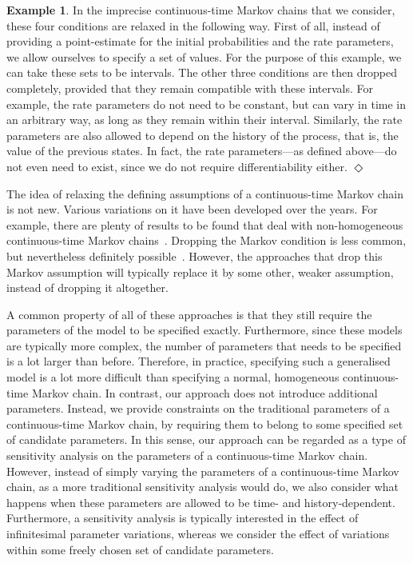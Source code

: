 \documentclass[10pt,a4paper]{paper}
\theoremstyle{definition}
\newtheorem{exmp}{Example}%
\newcommand{\exampleend}{\hfill$\Diamond$}
\begin{document}
\begin{exmp}
In the imprecise continuous-time Markov chains that we consider, these four conditions are relaxed in the following way. First of all, instead of providing a point-estimate for the initial probabilities and the rate parameters, we allow ourselves to specify a set of values. For the purpose of this example, we can take these sets to be intervals. The other three conditions are then dropped completely, provided that they remain compatible with these intervals. For example, the rate parameters do not need to be constant, but can vary in time in an arbitrary way, as long as they remain within their interval. Similarly, the rate parameters are also allowed to depend on the history of the process, that is, the value of the previous states. In fact, the rate parameters---as defined above---do not even need to exist, since we do not require differentiability either.
\exampleend\vspace{10pt}
\end{exmp}

The idea of relaxing the defining assumptions of a continuous-time Markov chain is not new. Various variations on it have been developed over the years.
For example, there are plenty of results to be found that deal with non-homogeneous continuous-time Markov chains~\cite{rindos1995exact,aalen1978empirical,johnson1989nonhomogeneous}.
Dropping the Markov condition is less common, but nevertheless definitely possible~\cite{Harlamov:1320525}. However, the approaches that drop this Markov assumption will typically replace it by some other, weaker assumption, instead of dropping it altogether. %

A common property of all of these approaches is that they still require the parameters of the model to be specified exactly. Furthermore, since these models are typically more complex, the number of parameters that needs to be specified is a lot larger than before. Therefore, in practice, specifying such a generalised model is a lot more difficult than specifying a normal, homogeneous continuous-time Markov chain.
In contrast, our approach does not introduce additional parameters. Instead, we provide constraints on the traditional parameters of a continuous-time Markov chain, by requiring them to belong to some specified set of candidate parameters.
In this sense, our approach can be regarded as a type of sensitivity analysis on the parameters of a continuous-time Markov chain. However, instead of simply varying the parameters of a continuous-time Markov chain, as a more traditional sensitivity analysis would do, we also consider what happens when these parameters are allowed to be time- and history-dependent. Furthermore, a sensitivity analysis is typically interested in the effect of infinitesimal parameter variations, whereas we consider the effect of variations within some freely chosen set of candidate parameters.
\end{document}

